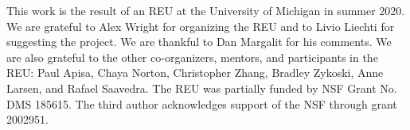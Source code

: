 This work is the result of an REU at the University of Michigan in summer 2020.  We are grateful to Alex Wright for organizing the REU and to Livio Liechti for suggesting the project. We are thankful to Dan Margalit for his comments.  We are also grateful to the other co-organizers, mentors, and participants in the REU: Paul Apisa, Chaya Norton, Christopher Zhang, Bradley Zykoski, Anne Larsen, and Rafael Saavedra.  The REU was partially funded by NSF Grant No. DMS 185615.  The third author acknowledges support of the NSF through grant 2002951.



